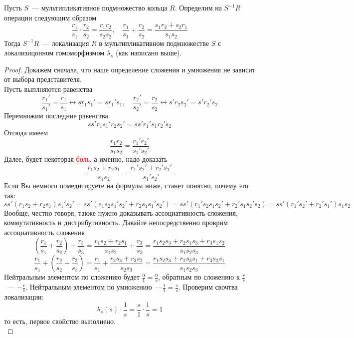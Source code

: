 \documentclass[11pt]{article}
\begin{document}
    \begin{theorem}
        Пусть $S$~--- мультипликативное подмножество кольца $R$. Определим на $S^{-1}R$ операции следующим образом
        \[ \frac{r_1}{s_1} \cdot \frac{r_2}{s_2} = \frac{r_1 r_2}{s_2 s_2}, \quad \frac{r_1}{s_1} + \frac{r_2}{s_2} = \frac{s_1 r_2 + s_2 r_1}{s_1 s_2} \]
        Тогда $S^{-1}R$~--- локализация $R$ в мультипликативном подмножестве $S$ с локализицонном гомоморфизмом $\lambda_s$ (как написано выше).
    \end{theorem}
    \begin{proof}
        Докажем сначала, что наше определение сложения и умножения не зависит от выбора представителя. \\
        Пусть выплняются равенства
        \[ \frac{r_1'}{s_1'} = \frac{r_1}{s_1} \leftrightarrow s r_1 s_1' = s r_1' s_1, \quad \frac{r_2'}{s_2'} = \frac{r_2}{s_2} \leftrightarrow s' r_2 s_2' = s' r_2' s_2 \]
        Перемножим последние равенства
        \[ s s' r_1 s_1' r_2 s_2' = s s' r_1' s_1 r_2' s_2 \]
        Отсюда имеем
        \[ \frac{r_1 r_2}{s_1 s_2} = \frac{r_1' r_2'}{s_1' s_2'} \]
        Далее, будет некоторая \textcolor{red}{боль}, а именно, надо доказать
        \[ \frac{r_1 s_2 + r_2 s_1}{s_1 s_2} = \frac{r_1' s_2' + r_2' s_1' }{s_1' s_2'} \]
        Если Вы немного помедитируете на формулы ниже, станет понятно, почему это так:
        \[ ss' (r_1 s_2 + r_2 s_1) s_1' s_2' = s s' (e_1 s_2 s_1' s_2' + r_2 s_1 s_1' s_2') =
        s s' (r_1' s_2 s_1 s_2' + r_2' s_1 s_2' s_2) = s s' (r_1' s_2' + r_2' s_1') s_1 s_2 \]
        Вообще, честно говоря, также нужно доказывать ассоциативность сложения, коммутативность и дистрибутивность.
        Давайте непосредственно проврим ассоциативность сложения
        \[ \left( \frac{r_1}{s_1} + \frac{r_2}{s_2} \right) + \frac{r_3}{s_3} = \frac{r_1 s_2 + r_2 s_1}{s_1 s_2} + \frac{r_3}{s_3} = \frac{r_1 s_2 s_3 + r_2 s_1 s_3 + r_3 s_1 s_2}{s_1 s_2 s_3} \]
        \[ \frac{r_1}{s_1} + \left( \frac{r_2}{s_2} + \frac{r_3}{s_3} \right) = \frac{r_1}{s_1} + \frac{r_2 s_3 + r_3 s_2}{s_2 s_3} = \frac{r_1 s_2 s_3 + r_2 s_3 s_1 + r_3 s_2 s_1}{s_1 s_2 s_3}\]
        Нейтральным элементом по сложению будет $\frac{0}{1} = \frac{0}{s}$, обратным по сложению к $\frac{r}{s}$~--- $-\frac{r}{s}$.
        Нейтральным элементом по умножению~---$\frac{1}{1} = \frac{s}{s}$. Проверим свочтва локализации:
        \[ \lambda_s(s) \cdot \frac{1}{s} = \frac{s}{1} \cdot \frac{1}{s} = 1 \]
        то есть, первое свойство выполнено. \\


\end{proof}
\end{document}
